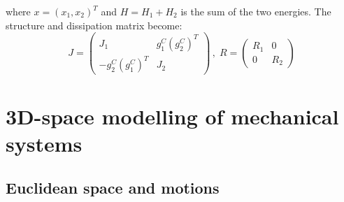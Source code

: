 \documentclass[a4paper,twoside, openright,12pt]{report}
\begin{document}
where $ x = (x_1, x_2)^T $ and $ H = H_1 + H_2 $ is the sum of the two energies. The structure and dissipation matrix become:
\[J = \begin{pmatrix} J_1 & g_1^C(g_2^C)^T \\ 
-g_2^C(g_1^C)^T & J_2\end{pmatrix} \, , \; 
R = \begin{pmatrix}
R_1 & 0 \\ 0 & R_2\end{pmatrix}\]



\section{3D-space modelling of mechanical systems}\label{S:3Dspace-modelling}


\subsection{Euclidean space and motions}\label{[SS:euclideanspacemotions]}
\end{document}
